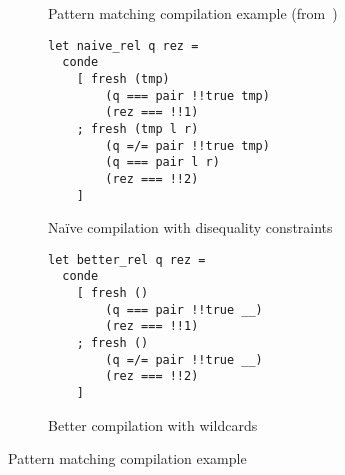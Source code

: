 \begin{figure*}[t!]
\begin{subfigure}[t]{0.48\textwidth}
\begin{subfigure}{0.5\linewidth}
      \label{fig:matching-example2}
    \end{subfigure}
    \addtocounter{subfigure}{-1}
    \caption{Pattern matching compilation example (from~\cite{maranget2001})} 
    \label{fig:match-example}
  \end{subfigure}
  \begin{subfigure}{0.49\textwidth}
    \centering
    \begin{lstlisting}
let naive_rel q rez =
  conde
    [ fresh (tmp) 
        (q === pair !!true tmp) 
        (rez === !!1)
    ; fresh (tmp l r) 
        (q =/= pair !!true tmp) 
        (q === pair l r)
        (rez === !!2) 
    ]
    \end{lstlisting}
    \caption{Na\"{i}ve compilation with disequality constraints}
    \label{fig:match-compilation-small-diseq}
  \end{subfigure}
  \begin{subfigure}{0.49\textwidth}
    \centering
    \begin{lstlisting}
let better_rel q rez =
  conde
    [ fresh () 
        (q === pair !!true __) 
        (rez === !!1)
    ; fresh () 
        (q =/= pair !!true __) 
        (rez === !!2) 
    ]
    \end{lstlisting}
    \caption{Better compilation with wildcards}
    \label{fig:match-compilation-small-wc}
  \end{subfigure}
  \caption{Pattern matching compilation example } 
  \label{fig:match-compilation-small}
\end{figure*}

